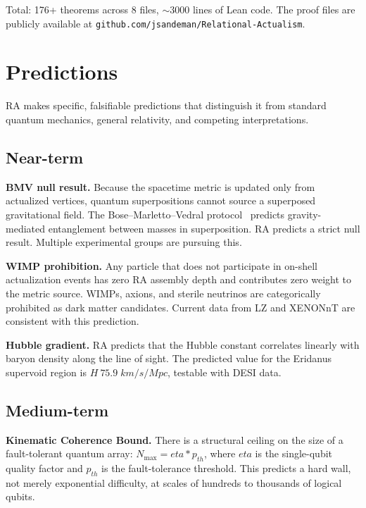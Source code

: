 \documentclass[11pt]{article}
\def\eta{eta}%
\def\mathrm#1{#1}%
\def\cdot{*}%
\def\approx{~}%
\begin{document}
Total: 176+ theorems across 8 files, $\sim$3000 lines of Lean code. The proof files are publicly available at \texttt{github.com/jsandeman/Relational-Actualism}.

\section{Predictions}
\label{sec:predictions}

RA makes specific, falsifiable predictions that distinguish it from standard quantum mechanics, general relativity, and competing interpretations.

\subsection{Near-term}

\textbf{BMV null result.} Because the spacetime metric is updated only from actualized vertices, quantum superpositions cannot source a superposed gravitational field. The Bose--Marletto--Vedral protocol~\cite{Bose2017,Marletto2017} predicts gravity-mediated entanglement between masses in superposition. RA predicts a strict null result. Multiple experimental groups are pursuing this.

\textbf{WIMP prohibition.} Any particle that does not participate in on-shell actualization events has zero RA assembly depth and contributes zero weight to the metric source. WIMPs, axions, and sterile neutrinos are categorically prohibited as dark matter candidates. Current data from LZ and XENONnT are consistent with this prediction.

\textbf{Hubble gradient.} RA predicts that the Hubble constant correlates linearly with baryon density along the line of sight. The predicted value for the Eridanus supervoid region is $H\approx 75.9\;\mathrm{km/s/Mpc}$, testable with DESI data.

\subsection{Medium-term}

\textbf{Kinematic Coherence Bound.} There is a structural ceiling on the size of a fault-tolerant quantum array: $N_{\max}=\eta\cdot p_{\mathrm{th}}$, where $\eta$ is the single-qubit quality factor and $p_{\mathrm{th}}$ is the fault-tolerance threshold. This predicts a hard wall, not merely exponential difficulty, at scales of hundreds to thousands of logical qubits.
\end{document}
